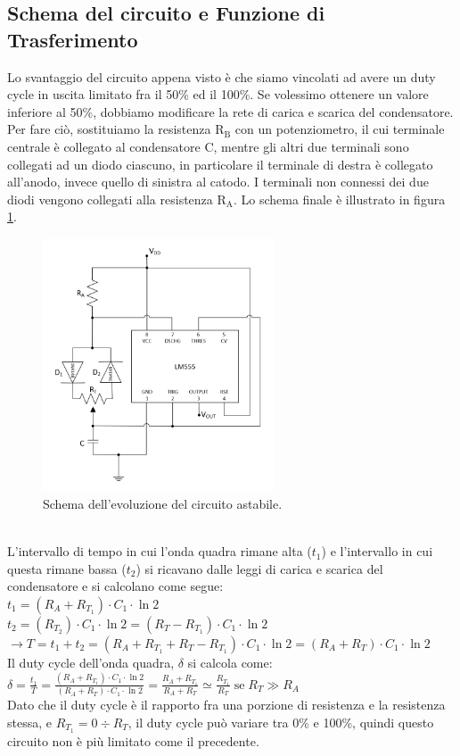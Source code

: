 \documentclass{report}
\begin{document}
\subsection{Schema del circuito e Funzione di Trasferimento}
Lo svantaggio del circuito appena visto è che siamo vincolati ad avere un duty cycle in uscita limitato fra il 50\% ed il 100\%. Se volessimo ottenere un valore inferiore al 50\%, dobbiamo modificare la rete di carica e scarica del condensatore. Per fare ciò, sostituiamo la resistenza $\mathrm{R_B}$ con un potenziometro, il cui terminale centrale è collegato al condensatore C, mentre gli altri due terminali sono collegati ad un diodo ciascuno, in particolare il terminale di destra è collegato all'anodo, invece quello di sinistra al catodo. I terminali non connessi dei due diodi vengono collegati alla resistenza $\mathrm{R_A}$. Lo schema finale è illustrato in figura \ref{figura:schema4}.
\begin{figure}[h!]
	\centering
	\includegraphics[height=7.5cm]{immagini/schema4}
	\caption{Schema dell'evoluzione del circuito astabile.}
	\label{figura:schema4}
\end{figure}
\\L'intervallo di tempo in cui l'onda quadra rimane alta ($t_1$) e l'intervallo in cui questa rimane bassa ($t_2$) si ricavano dalle leggi di carica e scarica del condensatore e si calcolano come segue:
\\[4pt]\indent$\displaystyle{t_1 = (R_A+R_{T_1})\cdot C_1\cdot \ln2}$
\\[4pt]\indent$\displaystyle{t_2 = (R_{T_2})\cdot C_1\cdot \ln2 = (R_T-R_{T_1})\cdot C_1\cdot \ln2}$
\\[4pt]\indent$\displaystyle{\rightarrow T=t_1+t_2=(R_A+R_{T_1}+R_T-R_{T_1})\cdot C_1\cdot \ln2 = (R_A+R_T)\cdot C_1\cdot \ln2}$
\\[4pt]Il duty cycle dell'onda quadra, $\delta$ si calcola come:
\\[4pt]\indent$\displaystyle{\delta=\frac{t_1}{T}=\frac{(R_A+R_{T_1})\cdot C_1\cdot \ln2}{(R_A+R_T)\cdot C_1\cdot \ln2}=\frac{R_A+R_{T_1}}{R_A+R_T}\simeq\frac{R_{T_1}}{R_T}\mathrm{\; se \;}R_{T}\gg R_A}$
\\[4pt]Dato che il duty cycle è il rapporto fra una porzione di resistenza e la resistenza stessa, e $\displaystyle{R_{T_1} = 0\div R_T}$, il duty cycle può variare tra 0\% e 100\%, quindi questo circuito non è più limitato come il precedente.
\end{document}
